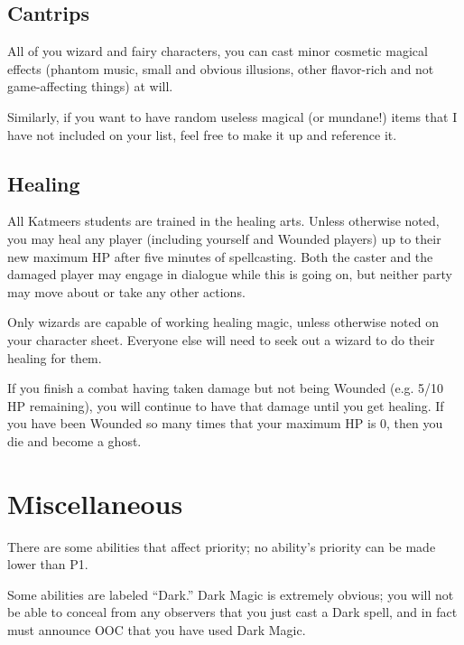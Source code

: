 \documentclass[blue]{Katmeers}
\begin{document}
\subsection*{Cantrips}
All of you wizard and fairy characters, you can cast minor cosmetic magical effects (phantom music, small and obvious illusions, other flavor-rich and not game-affecting things) at will.

Similarly, if you want to have random useless magical (or mundane!) items that I have not included on your list, feel free to make it up and reference it.

\subsection*{Healing}
All Katmeers students are trained in the healing arts.  Unless otherwise noted, you may heal any player (including yourself and Wounded players) up to their new maximum HP after five minutes of spellcasting.  Both the caster and the damaged player may engage in dialogue while this is going on, but neither party may move about or take any other actions.

Only wizards are capable of working healing magic, unless otherwise noted on your character sheet.  Everyone else will need to seek out a wizard to do their healing for them.

If you finish a combat having taken damage but not being Wounded (e.g. 5/10 HP remaining), you will continue to have that damage until you get healing. If you have been Wounded so many times that your maximum HP is 0, then you die and become a ghost.

\section{Miscellaneous}
There are some abilities that affect priority; no ability's priority can be made lower than P1.

Some abilities are labeled ``Dark.'' Dark Magic is extremely obvious; you will not be able to conceal from any observers that you just cast a Dark spell, and in fact must announce OOC that you have used Dark Magic.
\end{document}
